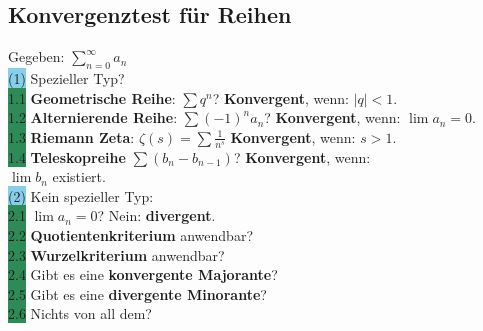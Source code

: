 \documentclass[landscape, 10pt]{article}
\begin{document}
\begin{multicols}{3}
       \subsection{Konvergenztest für Reihen}
              Gegeben: \textcolor{NavyBlue}{
              $\sum_{n=0}^\infty a_n$}\\
       \colorbox{SkyBlue}{(1)} Spezieller Typ?\\
              \colorbox{SeaGreen}{1.1} 
              \textbf{Geometrische Reihe}: 
                     \textcolor{NavyBlue}{$\sum q^n$}? 
                     \textbf{Konvergent}, 
                     wenn: \textcolor{NavyBlue}{$|q|<1$}.\\
              \colorbox{SeaGreen}{1.2} 
              \textbf{Alternierende Reihe}: 
                     \textcolor{NavyBlue}{$\sum(-1)^na_n$}? 
                     \textbf{Konvergent}, wenn:
                     \textcolor{NavyBlue}{$\lim a_n=0$}.\\
              \colorbox{SeaGreen}{1.3} 
              \textbf{Riemann Zeta}: 
                     \textcolor{NavyBlue}{
                     $\zeta(s)=\sum\frac{1}{n^s}$} 
                     \textbf{Konvergent}, wenn: 
                     \textcolor{NavyBlue}{$s>1$}.\\
              \colorbox{SeaGreen}{1.4} 
              \textbf{Teleskopreihe} 
                     \textcolor{NavyBlue}{$\sum(b_n-b_{n-1})$}? 
                     \textbf{Konvergent}, wenn:\\
              \textcolor{NavyBlue}{$\lim b_n$} existiert.\\
       \colorbox{SkyBlue}{(2)} Kein spezieller Typ:\\
              \colorbox{SeaGreen}{2.1} 
                     \textcolor{NavyBlue}{$\lim a_n=0$}? 
                     Nein: \textbf{divergent}.\\
              \colorbox{SeaGreen}{2.2} 
                     \textbf{Quotientenkriterium} anwendbar?\\
              \colorbox{SeaGreen}{2.3} 
                     \textbf{Wurzelkriterium} anwendbar?\\
              \colorbox{SeaGreen}{2.4} 
                     Gibt es eine 
                     \textbf{konvergente Majorante}?\\
              \colorbox{SeaGreen}{2.5} 
                     Gibt es eine 
                     \textbf{divergente Minorante}?\\
              \colorbox{SeaGreen}{2.6} 
                     Nichts von all dem?\\

\end{multicols}
\end{document}
